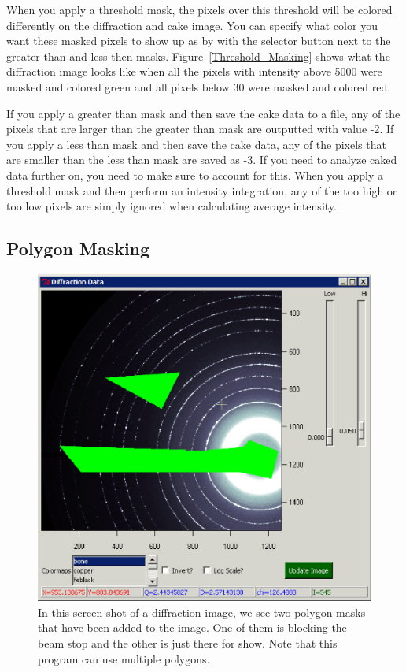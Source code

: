 When you apply a threshold mask, the pixels over this threshold 
will be colored differently on the diffraction and cake image. 
You can specify what color you want these masked pixels to show 
up as by with the  selector button next to the greater 
than and less then masks. Figure~\ref{Threshold_Masking} shows 
what the diffraction image looks like when all the pixels with 
intensity above 5000 were masked 
and colored green and all pixels below 30 were masked and
colored red.

If you apply a greater than mask and then save the cake data
to a file, any of the pixels that are larger than the greater
than mask are outputted with value -2. If you apply a less 
than mask and then save the cake data, any of the pixels
that are smaller than the less than mask are saved as -3.
If you need to analyze caked data further on, you need to
make sure to account for this. When you apply a threshold
mask and then perform an intensity integration, any of the 
too high or too low pixels are simply ignored when calculating
average intensity. 

\subsection{Polygon Masking}


\begin{figure}
\centering
\includegraphics[scale=.75]{figures/Displayed_Polygon.eps}
\caption{In this screen shot of a diffraction image, we
see two polygon masks that have been added to the
image. One of them is blocking the beam stop and
the other is just there for show. Note that this program 
can use multiple polygons.}
\label{Displayed_Polygon}
\end{figure}


